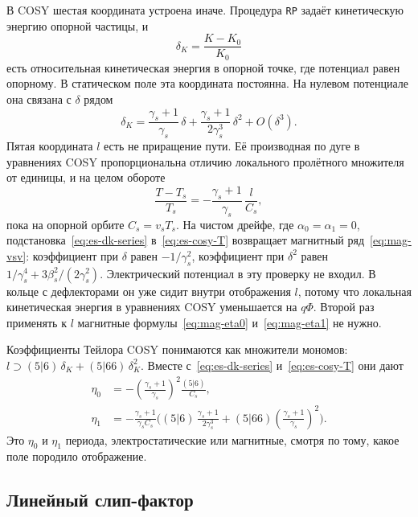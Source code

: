 В COSY шестая координата устроена иначе. Процедура \texttt{RP} задаёт кинетическую энергию опорной частицы, и
\begin{equation}
\label{eq:es-deltak}
\delta_K=\frac{K-K_0}{K_0}
\end{equation}
есть относительная кинетическая энергия в опорной точке, где потенциал равен опорному. В статическом поле эта координата постоянна. На нулевом потенциале она связана с $\delta$ рядом
\begin{equation}
\label{eq:es-dk-series}
\delta_K
=\frac{\gamma_s+1}{\gamma_s}\,\delta
+\frac{\gamma_s+1}{2\gamma_s^3}\,\delta^2
+O(\delta^3).
\end{equation}
Пятая координата $l$ есть не приращение пути. Её производная по дуге в уравнениях COSY пропорциональна отличию локального пролётного множителя от единицы, и на целом обороте
\begin{equation}
\label{eq:es-cosy-T}
\frac{T-T_s}{T_s}
=-\frac{\gamma_s+1}{\gamma_s}\,\frac{l}{C_s},
\end{equation}
пока на опорной орбите $C_s=v_s T_s$. На чистом дрейфе, где $\alpha_0=\alpha_1=0$, подстановка~\eqref{eq:es-dk-series} в~\eqref{eq:es-cosy-T} возвращает магнитный ряд~\eqref{eq:mag-vsv}: коэффициент при $\delta$ равен $-1/\gamma_s^2$, коэффициент при $\delta^2$ равен $1/\gamma_s^4+3\beta_s^2/(2\gamma_s^2)$. Электрический потенциал в эту проверку не входил. В кольце с дефлекторами он уже сидит внутри отображения $l$, потому что локальная кинетическая энергия в уравнениях COSY уменьшается на $q\Phi$. Второй раз применять к $l$ магнитные формулы~\eqref{eq:mag-eta0} и~\eqref{eq:mag-eta1} не нужно.

Коэффициенты Тейлора COSY понимаются как множители мономов: $l\supset(5|6)\,\delta_K+(5|66)\,\delta_K^2$. Вместе с~\eqref{eq:es-dk-series} и~\eqref{eq:es-cosy-T} они дают
\begin{align}
\eta_0
&=
-\left(\frac{\gamma_s+1}{\gamma_s}\right)^2\frac{(5|6)}{C_s},
\label{eq:es-eta0-map}\\
\eta_1
&=
-\frac{\gamma_s+1}{\gamma_s C_s}
\Biggl(
(5|6)\,\frac{\gamma_s+1}{2\gamma_s^3}
+(5|66)\left(\frac{\gamma_s+1}{\gamma_s}\right)^2
\Biggr).
\label{eq:es-eta1-map}
\end{align}
Это $\eta_0$ и $\eta_1$ периода, электростатические или магнитные, смотря по тому, какое поле породило отображение.

\subsection{Линейный слип-фактор}
\label{sec:es-eta0}

